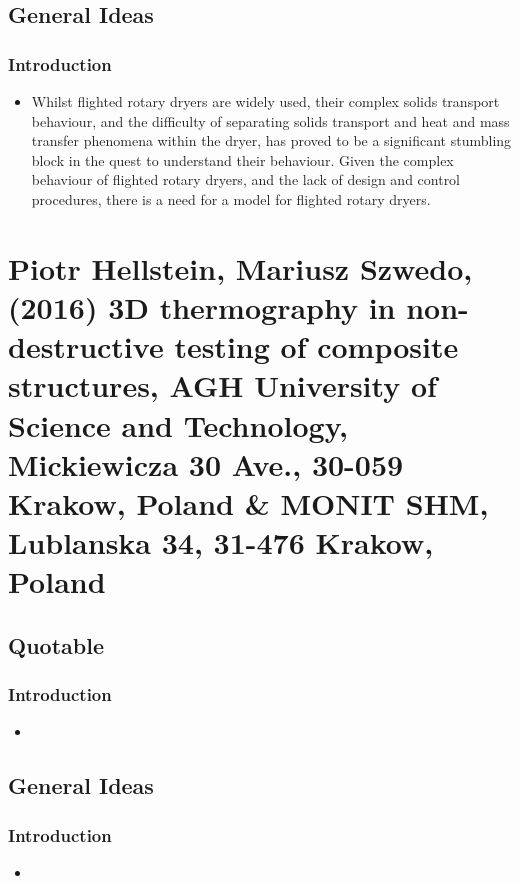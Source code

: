 \documentclass[12pt]{article}
\begin{document}
	\subsection{General Ideas}
	
	\subsubsection{Introduction}
	\begin{itemize}
		
		\item Whilst flighted rotary dryers are widely used, their complex solids transport
		behaviour, and the difficulty of separating solids transport and heat and mass transfer
		phenomena within the dryer, has proved to be a significant stumbling block in the
		quest to understand their behaviour. Given the complex behaviour of flighted rotary
		dryers, and the lack of design and control procedures, there is a need for a model for
		flighted rotary dryers.
		
	\end{itemize}

\section{Piotr Hellstein, Mariusz Szwedo, (2016) 3D thermography in non-destructive testing of composite structures, AGH University of Science and Technology, Mickiewicza 30 Ave., 30-059 Krakow, Poland \& MONIT SHM, Lublanska 34, 31-476 Krakow, Poland}

\subsection{Quotable}

\subsubsection{Introduction}
\begin{itemize}
	\item 
\end{itemize}

\subsection{General Ideas}

\subsubsection{Introduction}
\begin{itemize}
	\item 
\end{itemize}
\end{document}
